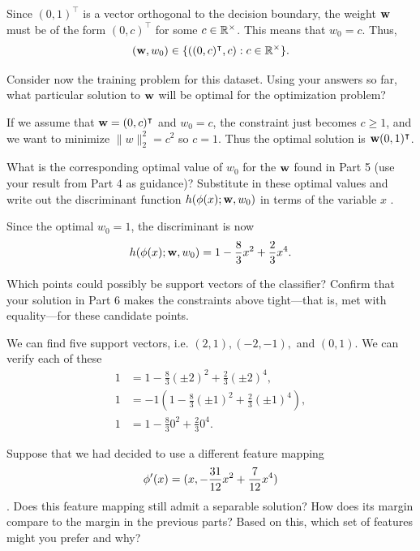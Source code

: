 \documentclass[expanded]{lkx_pset}
\begin{document}
\begin{parts}
	Since $(0,1)^\intercal$ is a vector orthogonal to the decision boundary, the weight $\mathbf{w}$ must be of the form $(0,c)^\intercal$ for some $c\in \mathbb{R}^\times$. This means that $w_0=c$. Thus,
	\[
		(\mathbf{w}, w_0) \in \{ ((0,c)^\intercal, c) : c\in \mathbb{R}^\times \}.
	\]

	\begin{part}{5} Consider now the training problem for this dataset. Using your answers so far,
		what particular solution to $\mathbf{w}$ will be optimal for the
		optimization problem?
	\end{part}

	If we assume that $\mathbf{w}=(0,c)^\intercal$ and $w_0=c$, the constraint just becomes $c\geq 1$, and we want to minimize $\|w\|_2^2 = c^2$ so $c=1$. Thus the optimal solution is $\mathbf{w}(0,1)^\intercal$.

	\begin{part}{6} What is the corresponding optimal value of $w_0$ for the $\mathbf{w}$ found in Part 5 (use your result from Part 4 as guidance)? Substitute in these optimal values and write out the discriminant function
		$h(\mathbf{\phi}(x);\mathbf{w},w_0)$ in terms of the variable $x$ .
	\end{part}

	Since the optimal $w_0=1$, the discriminant is now
	\[
		h(\phi(x); \mathbf{w}, w_0) = 1-\frac{8}{3}x^2 + \frac{2}{3}x^4.
	\]

	\begin{part}{7} Which points could possibly be support vectors of the classifier?  Confirm that
		your solution in Part 6 makes the constraints above tight---that is,
		met with equality---for these candidate points.
	\end{part}

	We can find five support vectors, i.e. $(2,1), (-2,-1),$ and $(0,1)$. We can verify each of these
	\[
		\begin{aligned}
			1 & = 1-\frac{8}{3}(\pm 2)^2 +\frac{2}{3}(\pm 2)^4,                  \\
			1 & = -1\left(1-\frac{8}{3}(\pm 1)^2  + \frac{2}{3}(\pm 1)^4\right), \\
			1 & = 1-\frac{8}{3}0^2 + \frac{2}{3}0^4.
		\end{aligned}
	\]

	\pagebreak
	\begin{part}{8} Suppose that we had decided to use a different feature mapping
		\[\mathbf{\phi}'(x) = (x, -\frac{31}{12}x^2 + \frac{7}{12}x^4 )\].  Does
		this feature mapping still admit a separable solution?  How does
		its margin compare to the margin in the previous parts?  Based on
		this, which set of features might you prefer and why?
	\end{part}


\end{parts}
\end{document}
